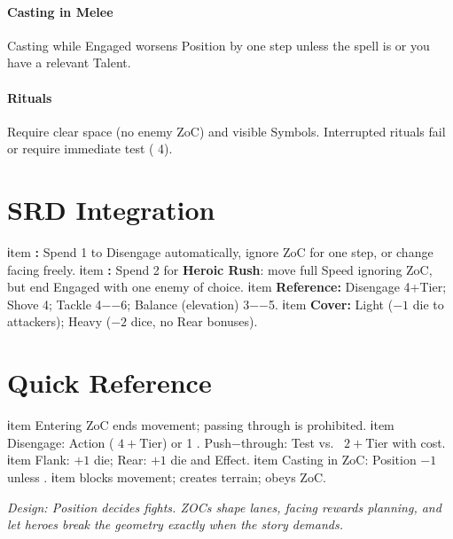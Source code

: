 \documentclass[11pt]{article}
\begin{document}
\paragraph{Casting in Melee}
Casting while Engaged worsens Position by one step unless the spell is  or you have a relevant Talent.

\paragraph{Rituals}
Require clear space (no enemy ZoC) and visible Symbols. Interrupted rituals fail or require immediate test (\DV{} 4).

\section{SRD Integration}
\begin{itemize}
  ℹtem \textbf{\Boons:} Spend 1 to Disengage automatically, ignore ZoC for one step, or change facing freely.
  ℹtem \textbf{\Boons:} Spend 2 for \textbf{Heroic Rush}: move full Speed ignoring ZoC, but end Engaged with one enemy of choice.
  ℹtem \textbf{\DV{} Reference:} Disengage 4+Tier; Shove 4; Tackle 4−−6; Balance (elevation) 3−−5.
  ℹtem \textbf{Cover:} Light ($−1$ die to attackers); Heavy ($−2$ dice, no Rear bonuses).
\end{itemize}

\section{Quick Reference}
\begin{itemize}
  ℹtem Entering ZoC ends movement; passing through is prohibited.
  ℹtem Disengage: Action (\DV{} $4+\text{Tier}$) or 1 \Boon{}. Push−through: Test vs.\ \DV{} $2+\text{Tier}$ with cost.
  ℹtem Flank: $+1$ die; Rear: $+1$ die and Effect.
  ℹtem Casting in ZoC: Position $−1$ unless .
  ℹtem  blocks movement;  creates terrain;  obeys ZoC.
\end{itemize}

\bigskip
\noindent\textit{Design: Position decides fights. ZOCs shape lanes, facing rewards planning, and \Boons{} let heroes break the geometry exactly when the story demands.}
\end{document}
